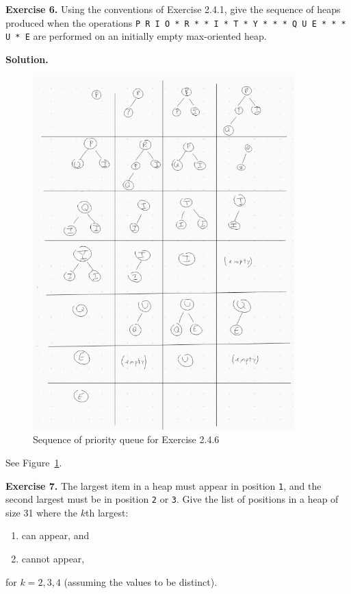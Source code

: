 \documentclass[12pt, a4paper]{article}
\newenvironment{ex}[2][Exercise]
{\par\medskip\noindent \textbf{#1 #2.}}
{\medskip}
\newenvironment{sol}[1][Solution]
{\par\medskip\noindent \textbf{#1.} }
{\medskip}
\begin{document}
	\begin{ex}{6}
		Using the conventions of Exercise 2.4.1, give the sequence of heaps produced
		when the operations \texttt{P R I O * R * * I * T * Y * * * Q U E * * * U * E} are
		performed on an initially empty max-oriented heap.
	\end{ex}
	\begin{sol}
		\begin{figure}
			\centering
			\includegraphics[width=0.9\textwidth]{exercise-06}
			\caption{Sequence of priority queue for Exercise 2.4.6}
			\label{fig:ex-06}
		\end{figure}
		See Figure~\ref{fig:ex-06}.
	\end{sol}
	\begin{ex}{7}
		The largest item in a heap must appear in position \texttt{1}, and the second
		largest must be in position \texttt{2} or \texttt{3}. Give the list of positions
		in a heap of size 31 where the $k$th largest:
		\begin{enumerate}[label=(\roman*)]
			\item can appear, and
			\item cannot appear,
		\end{enumerate}
		for $k=2,3,4$  (assuming the values to be distinct).
	\end{ex}
\end{document}
